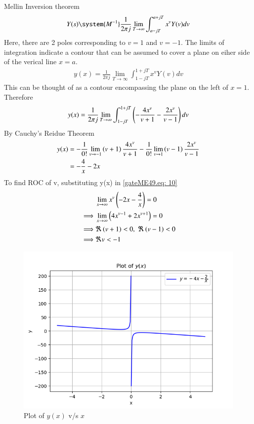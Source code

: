 \documentclass[journal,12pt,twocolumn]{IEEEtran}
\theoremstyle{remark}
\begin{document}
Mellin Inversion theorem
\begin{align}
    Y(s) \system{M^{-1}} \frac{1}{2\pi j} \lim_{T \rightarrow \infty}\int_{a-jT}^{a+jT} x^vY(v)dv
\end{align}
Here, there are 2 poles corresponding to $v=1$ and $v=-1$. The limits of integration indicate a contour that can be assumed to cover a plane on eiher side of the verical line $x=a$.
\begin{align}
    y(x)=\frac{1}{2\pi j}\lim_{T\rightarrow \infty} \int_{1-jT}^{1+jT}x^v Y(v)dv 
\end{align}
This can be thought of as a contour encompassing the plane on the left of $x=1$.
Therefore
\begin{align}
    y(x)=\frac{1}{2\pi j}\lim_{T\rightarrow \infty} \int_{1-jT}^{1+jT} \left(-\frac{4x^v}{v+1}-\frac{2x^v}{v-1}\right)dv 
\end{align}
By Cauchy's Reidue Theorem
\begin{align}
    y(x)&=-\frac{1}{0!}\lim_{v\rightarrow -1} \left(v+1\right) \frac{4x^v}{v+1} - \frac{1}{0!}\lim_{v\rightarrow 1}\left(v-1\right) \frac{2x^v}{v-1} \\
    &= -\frac{4}{x} -2x
\end{align}
To find ROC of v, substituting y(x) in \eqref{gateME49.eq: 10}
\begin{align} 
    &\lim_{x\rightarrow \infty} x^v \left(-2x-\frac{4}{x}\right)=0\\ \label{gateME49.eq:24}
    \implies& \lim_{x\rightarrow \infty} \left(4x^{v-1}+2x^{v+1}\right)=0\\
    \implies& \Re \left(v+1\right)<0,\;\Re \left(v-1\right)<0\\
    \implies& \Re v<-1\label{gateME49.eq:27}
\end{align}

\begin{figure}[h]
    \centering
    \includegraphics[width=\columnwidth]{figs/fig.png}
    \caption{Plot of $y(x)$ v/s $x$}
\end{figure}
\end{document}
